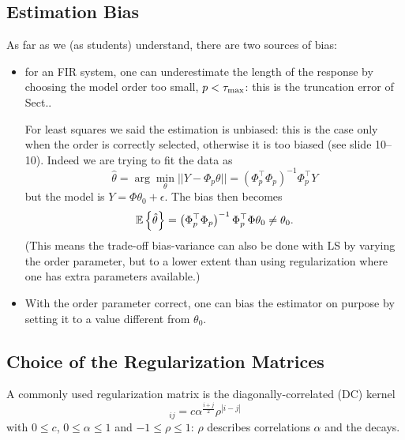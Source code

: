 \subsection{Estimation Bias}
\label{sec:estimation-bias}

As far as we (as students) understand, there are two sources of bias:
\begin{itemize}
\item for an FIR system, one can underestimate the length of the response by choosing the model order too small, $p<\tau_\text{max}$: this is the truncation error of Sect..

  For least squares we said the estimation is unbiased: this is the case only when the order is correctly selected, otherwise it is too biased (see slide 10--10). Indeed we are trying to fit the data as
  \begin{equation*}
    \hat{\theta} = \arg \min_\theta ||Y - \Phi_p\theta|| = \left(\Phi_p^\top \Phi_p\right)^{-1}\Phi_p^\top Y
  \end{equation*}
  but the model is $Y = \Phi\theta_0 + \epsilon$. The bias then becomes
  \begin{equation*}
    \mathbb{E}\left\{\hat{\theta}\right\} = \left(\Phi_p^\top \Phi_p\right)^{-1}\Phi_p^\top\Phi \theta_0 \neq \theta_0.
  \end{equation*}
  (This means the trade-off bias-variance can also be done with LS by varying the order parameter, but to a lower extent than using regularization where one has extra parameters available.)
\item With the order parameter correct, one can bias the estimator on purpose by setting it to a value different from $\theta_0$.
\end{itemize}

\subsection{Choice of the Regularization Matrices}
\label{sec:regularization-matrices}

A commonly used regularization matrix is the diagonally-correlated (DC) kernel
\begin{equation*}
  [P]_{ij} = c\alpha^{\frac{i+j}{2}}\rho^{|i-j|}
\end{equation*}
with $0 \le c$, $0 \le \alpha \le 1$ and $-1 \le \rho \le 1$: $\rho$ describes correlations $\alpha$ and the decays.

